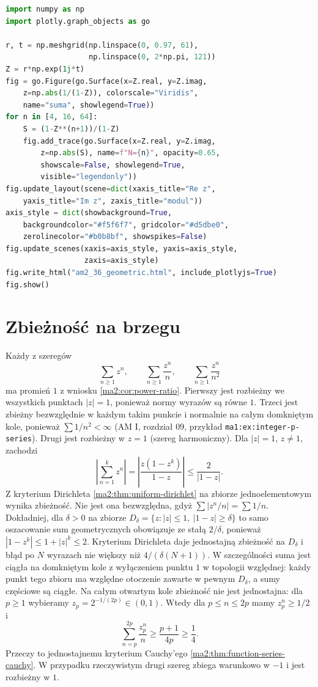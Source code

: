 \begin{lstlisting}[language=Python]
import numpy as np
import plotly.graph_objects as go

r, t = np.meshgrid(np.linspace(0, 0.97, 61),
                   np.linspace(0, 2*np.pi, 121))
Z = r*np.exp(1j*t)
fig = go.Figure(go.Surface(x=Z.real, y=Z.imag,
    z=np.abs(1/(1-Z)), colorscale="Viridis",
    name="suma", showlegend=True))
for n in [4, 16, 64]:
    S = (1-Z**(n+1))/(1-Z)
    fig.add_trace(go.Surface(x=Z.real, y=Z.imag,
        z=np.abs(S), name=f"N={n}", opacity=0.65,
        showscale=False, showlegend=True,
        visible="legendonly"))
fig.update_layout(scene=dict(xaxis_title="Re z",
    yaxis_title="Im z", zaxis_title="modul"))
axis_style = dict(showbackground=True,
    backgroundcolor="#f5f6f7", gridcolor="#d5dbe0",
    zerolinecolor="#b0b8bf", showspikes=False)
fig.update_scenes(xaxis=axis_style, yaxis=axis_style,
                  zaxis=axis_style)
fig.write_html("am2_36_geometric.html", include_plotlyjs=True)
fig.show()
\end{lstlisting}

\section{Zbieżność na brzegu}

\begin{przyklad}
\label{ma2:ex:power-boundary}
Każdy z szeregów
\[
 \sum_{n\ge1}z^n,\qquad
 \sum_{n\ge1}\frac{z^n}{n},\qquad
 \sum_{n\ge1}\frac{z^n}{n^2}
\]
ma promień $1$ z wniosku \ref{ma2:cor:power-ratio}.
Pierwszy jest rozbieżny we wszystkich punktach
$|z|=1$, ponieważ normy wyrazów są równe $1$.
Trzeci jest zbieżny bezwzględnie w każdym
takim punkcie i normalnie na całym domkniętym
kole, ponieważ $\sum 1/n^2<\infty$
(AM I, rozdział 09, przykład
\texttt{ma1:ex:integer-p-series}).
Drugi jest rozbieżny w $z=1$ (szereg harmoniczny).
Dla $|z|=1$, $z\ne1$, zachodzi
\[
 \left|\sum_{n=1}^k z^n\right|
 =\left|\frac{z(1-z^k)}{1-z}\right|
 \le\frac{2}{|1-z|}.
\]
Z kryterium Dirichleta
\ref{ma2:thm:uniform-dirichlet} na zbiorze
jednoelementowym wynika zbieżność. Nie jest
ona bezwzględna, gdyż $\sum |z^n/n|=\sum1/n$.
Dokładniej, dla $\delta>0$ na zbiorze
$D_\delta=\{z:|z|\le1,\ |1-z|\ge\delta\}$
to samo oszacowanie sum geometrycznych
obowiązuje ze stałą $2/\delta$, ponieważ
$|1-z^k|\le1+|z|^k\le2$.
Kryterium Dirichleta daje jednostajną zbieżność
na $D_\delta$ i błąd po $N$ wyrazach
nie większy niż $4/(\delta(N+1))$.
W szczególności suma jest ciągła na
domkniętym kole z wyłączeniem punktu $1$
w topologii względnej: każdy punkt tego zbioru
ma względne otoczenie zawarte w pewnym
$D_\delta$, a sumy częściowe są ciągłe.
Na całym otwartym kole zbieżność nie jest
jednostajna: dla $p\ge1$ wybieramy
$z_p=2^{-1/(2p)}\in(0,1)$.
Wtedy dla $p\le n\le2p$ mamy
$z_p^n\ge1/2$ i
\[
 \sum_{n=p}^{2p}\frac{z_p^n}{n}
 \ge\frac{p+1}{4p}\ge\frac14.
\]
Przeczy to jednostajnemu kryterium Cauchy'ego
\ref{ma2:thm:function-series-cauchy}. W przypadku rzeczywistym
drugi szereg zbiega warunkowo w $-1$
i jest rozbieżny w $1$.
\end{przyklad}

